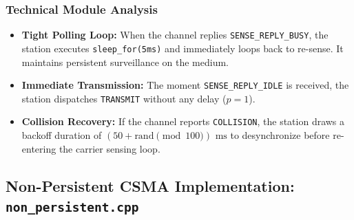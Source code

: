 \documentclass[12pt, a4paper]{article}
\begin{document}
\subsubsection{Technical Module Analysis}
\begin{itemize}
    \item \textbf{Tight Polling Loop:} When the channel replies \texttt{SENSE\_REPLY\_BUSY}, the station executes \texttt{sleep\_for(5ms)} and immediately loops back to re-sense. It maintains persistent surveillance on the medium.
    \item \textbf{Immediate Transmission:} The moment \texttt{SENSE\_REPLY\_IDLE} is received, the station dispatches \texttt{TRANSMIT} without any delay ($p=1$).
    \item \textbf{Collision Recovery:} If the channel reports \texttt{COLLISION}, the station draws a backoff duration of $(50 + \text{rand} \pmod{100})\text{ ms}$ to desynchronize before re-entering the carrier sensing loop.
\end{itemize}

\subsection{Non-Persistent CSMA Implementation: \texttt{non\_persistent.cpp}}
\end{document}
